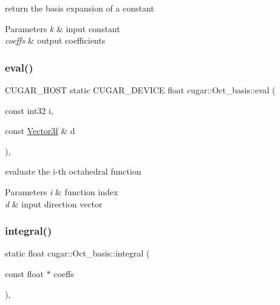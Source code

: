 return the basis expansion of a constant


\begin{DoxyParams}{Parameters}
{\em k} & input constant \\
\hline
{\em coeffs} & output coefficients \\
\hline
\end{DoxyParams}
\mbox{\label{structcugar_1_1_oct__basis_ab022f5b4779951eb1b8c40fae43dc97e}} 
\subsubsection{\texorpdfstring{eval()}{eval()}}
{\footnotesize\ttfamily C\+U\+G\+A\+R\+\_\+\+H\+O\+ST static C\+U\+G\+A\+R\+\_\+\+D\+E\+V\+I\+CE float cugar\+::\+Oct\+\_\+basis\+::eval (\begin{DoxyParamCaption}\item[{const int32}]{i,  }\item[{const \hyperlink{structcugar_1_1_vector}{Vector3f} \&}]{d }\end{DoxyParamCaption})\hspace{0.3cm}{\ttfamily [inline]}, {\ttfamily [static]}}

evaluate the i-\/th octahedral function


\begin{DoxyParams}{Parameters}
{\em i} & function index \\
\hline
{\em d} & input direction vector \\
\hline
\end{DoxyParams}
\mbox{\label{structcugar_1_1_oct__basis_acdc78f23aeaa874638b5acca1ee7c20b}} 
\subsubsection{\texorpdfstring{integral()}{integral()}\hspace{0.1cm}{\footnotesize\ttfamily [1/2]}}
{\footnotesize\ttfamily static float cugar\+::\+Oct\+\_\+basis\+::integral (\begin{DoxyParamCaption}\item[{const float $\ast$}]{coeffs }\end{DoxyParamCaption})\hspace{0.3cm}{\ttfamily [inline]}, {\ttfamily [static]}}

